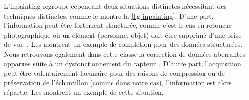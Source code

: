 L'inpainting regroupe cependant deux situations distinctes nécessitant des techniques distinctes, comme le montre la \cref{fig-inpainting}. D'une part, l'information peut être fortement structurée, comme c'est le cas en retouche photographique où un élément (personne, objet) doit être supprimé d'une prise de vue~\cite{criminisi2004region}. Les  montrent un exemple de complétion pour des données structurées. Nous retrouvons également dans cette classe la correction de données aberrantes apparues suite à un dysfonctionnement du capteur~\cite{zhang2013hyperspectral}. D'autre part, l'acquisition peut être volontairement lacunaire pour des raisons de compression ou de préservation de l'échantillon (comme dans notre cas), l'information est alors répartie. Les  montrent un exemple de cette situation.

